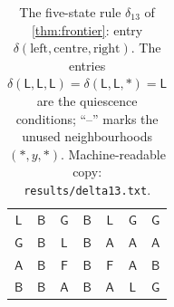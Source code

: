 \begin{table}[p]
\begin{tabular}{@{}cc|ccccc@{}}
$\mathsf{L}$ & $\mathsf{B}$ & $\mathsf{G}$ & $\mathsf{B}$ & $\mathsf{L}$ & $\mathsf{G}$ & $\mathsf{G}$\\
$\mathsf{G}$ & $\mathsf{B}$ & $\mathsf{L}$ & $\mathsf{B}$ & $\mathsf{A}$ & $\mathsf{A}$ & $\mathsf{A}$\\
$\mathsf{A}$ & $\mathsf{B}$ & $\mathsf{F}$ & $\mathsf{B}$ & $\mathsf{F}$ & $\mathsf{A}$ & $\mathsf{B}$\\
$\mathsf{B}$ & $\mathsf{B}$ & $\mathsf{A}$ & $\mathsf{B}$ & $\mathsf{A}$ & $\mathsf{L}$ & $\mathsf{G}$\\
\bottomrule
\end{tabular}
\caption{The five-state rule $\delta_{13}$ of \cref{thm:frontier}: entry $\delta(\text{left},\text{centre},\text{right})$. The entries $\delta(\mathsf L,\mathsf L,\mathsf L)=\delta(\mathsf L,\mathsf L,\ast)=\mathsf L$ are the quiescence conditions; ``--'' marks the unused neighbourhoods $(\ast,y,\ast)$. Machine-readable copy: \texttt{results/delta13.txt}.}
\label{tab:delta13}
\end{table}
